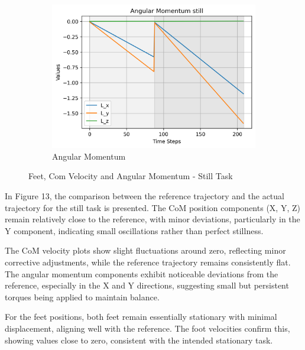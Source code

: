\documentclass[main.tex]{subfiles}
\begin{document}
\begin{figure}[htbp]
\begin{subfigure}[b]{0.32\textwidth}
        \includegraphics[width=\textwidth]{figures/Angular Momentum still.png}
        \caption{Angular Momentum}
        \label{fig:sub3}
    \end{subfigure}
    \caption{Feet, Com Velocity and Angular Momentum - Still Task}
    \label{fig:threeimages}
\end{figure}
In Figure 13, the comparison between the reference trajectory and the actual trajectory for the still task is presented. The CoM position components (X, Y, Z) remain relatively close to the reference, with minor deviations, particularly in the Y component, indicating small oscillations rather than perfect stillness.

The CoM velocity plots show slight fluctuations around zero, reflecting minor corrective adjustments, while the reference trajectory remains consistently flat. The angular momentum components exhibit noticeable deviations from the reference, especially in the X and Y directions, suggesting small but persistent torques being applied to maintain balance.

For the feet positions, both feet remain essentially stationary with minimal displacement, aligning well with the reference. The foot velocities confirm this, showing values close to zero, consistent with the intended stationary task.
\end{document}
